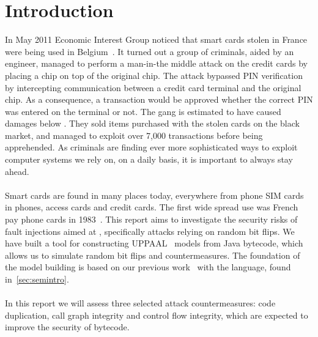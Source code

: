 \chapter{Introduction}
In May 2011 Economic Interest Group noticed that smart cards stolen in France were being used in Belgium~\cite{fun}. It turned out a group of criminals, aided by an engineer, managed to perform a man-in-the middle attack on the credit cards by placing a chip on top of the original chip. The attack bypassed PIN verification by intercepting communication between a credit card terminal and the original chip. As a consequence, a transaction would be approved whether the correct PIN was entered on the terminal or not. The gang is estimated to have caused damages below . They sold items purchased with the stolen cards on the black market, and managed to exploit over 7,000 transactions before being apprehended. As criminals are finding ever more sophisticated ways to exploit computer systems we rely on, on a daily basis, it is important to always stay ahead.\\\\
Smart cards are found in many places today, everywhere from phone SIM cards in phones, access cards and credit cards. The first wide spread use was French pay phone cards in 1983~\cite[p. 366]{modbank}. This report aims to investigate the security risks of fault injections aimed at \jc{}, specifically attacks relying on random bit flips. 
We have built a tool for constructing UPPAAL~\cite{upptut} models from Java bytecode, which allows us to simulate random bit flips and countermeasures. 
The foundation of the model building is based on our previous work~\cite{javasec} with the \jcl language, found in~\cref{sec:semintro}.\\\\
In this report we will assess three selected attack countermeasures: code duplication, call graph integrity and control flow integrity, which are expected to improve the security of \jc bytecode.
